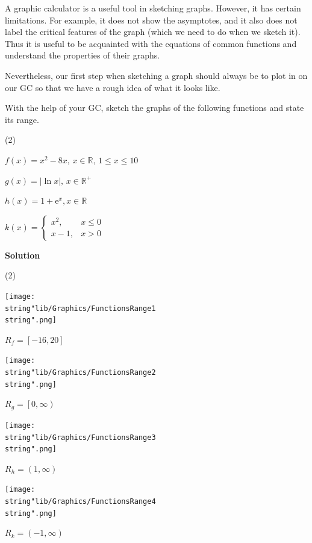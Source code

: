 \documentclass[11pt,a4paper]{book}
\newcommand{\R}{\mathbb{R}}
\begin{document}
\medskip{}

A graphic calculator is a useful tool in sketching graphs. However,
it has certain limitations. For example, it does not show the asymptotes, and it also does not label the critical features of the graph (which we need to do when we sketch it). Thus it is useful to be acquainted with the equations of common functions and understand the properties of their graphs.

\medskip{}

Nevertheless, our first step when sketching a graph should always be to plot in on our GC so that we have a rough idea of what it looks like.

\newpage

\begin{example}{}

With the help of your GC, sketch the graphs of the following functions and state its range.

\begin{tasks}[label=(\alph*),label-width=3.5ex](2)

\task  $f\left(x\right)=x^{2}-8x,\,x\in\R,\,1\leq x\leq10$

\task  $g\left(x\right)=\left|\ln x\right|,\,x\in\R^{+}$

\task  $h\left(x\right)=1+\mathrm{e}^{x},x\in\R$

\task  $k\left(x\right)=\begin{cases}
x^{2}, & x\leq0\\
x-1, & x>0
\end{cases}$

\end{tasks}

\textbf{Solution}

\begin{tasks}[label=(\alph*),label-width=3.5ex](2)

\task  \texttt{[image: \\string"lib/Graphics/FunctionsRange1\\string".png]}

$R_{f}=\left[-16,20\right]$

\task \texttt{[image: \\string"lib/Graphics/FunctionsRange2\\string".png]}

$R_{g}=\left[0,\infty\right)$

\task \texttt{[image: \\string"lib/Graphics/FunctionsRange3\\string".png]}

$R_{h}=\left(1,\infty\right)$

\task \texttt{[image: \\string"lib/Graphics/FunctionsRange4\\string".png]}

$R_{k}=\left(-1,\infty\right)$

\end{tasks}

\end{example}
\end{document}
